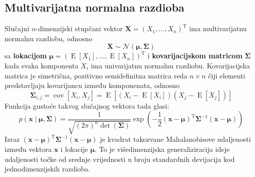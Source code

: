 \documentclass[times, utf8, zavrsni]{fer}
\begin{document}
\subsection{Multivarijatna normalna razdioba}
Slučajni $n$-dimenzijski stupčani vektor $\mathbf{X} = \left(X_1, \dots, X_n\right)^{\mathrm{T}}$ ima multivarijatnu normalnu razdiobu, odnosno
\[\mathbf{X} \sim \mathcal{N} \left(\boldsymbol{\mu}, \boldsymbol{\Sigma}\right)\]
sa \textbf{lokacijom}
$\boldsymbol{\mu} = \left(\operatorname{E}[X_1], \dots, \operatorname{E}[X_n]\right)^{\mathrm{T}}$ i \textbf{kovarijacijskom matricom} $\boldsymbol{\Sigma}$ kada svaka komponenta $X_i$ ima univarijatnu normalnu razdiobu. Kovarijacijska matrica je simetrična, pozitivno semidefinitna matrica reda $n \times n$ čiji elementi predstavljaju kovarijancu između komponenata, odnosno
\[\boldsymbol{\Sigma}_{i,j} = \operatorname{cov}
\left[X_i, X_j\right] 
= \operatorname{E}\left[ 
            \left(X_i - \operatorname{E}[X_i]\right)
            \left(X_j - \operatorname{E}[X_j]\right)
\right]
\]
Funkcija gustoće takvog slučajnog vektora tada glasi:
\begin{equation}
\label{gaussdensity}
p \left(\mathbf{x} \middle| \boldsymbol{\mu}, \boldsymbol{\Sigma}\right)
= \frac{1}{\sqrt{\left(2 \pi\right)^n \operatorname{det} \left(\boldsymbol{\Sigma}\right)}}
\exp{\left(
    -\frac{1}{2}
        \left(\mathbf{x} - \boldsymbol{\mu}\right)^{\mathrm{T}}
        \boldsymbol{\Sigma}^{-1}
        \left(\mathbf{x} - \boldsymbol{\mu}\right)
\right)}
\end{equation}
Izraz
$\left(\mathbf{x} - \boldsymbol{\mu}\right)^{\mathrm{T}}
        \boldsymbol{\Sigma}^{-1}
        \left(\mathbf{x} - \boldsymbol{\mu}\right)
$ je kvadrat takozvane Mahalanobisove udaljenosti između vektora $\mathbf{x}$ i lokacije $\boldsymbol{\mu}$. To je višedimenzijska generaliziracija ideje udaljenosti točke od srednje vrijednosti u broju standardnih devijacija kod jednodimenzijskih razdioba.
\end{document}
